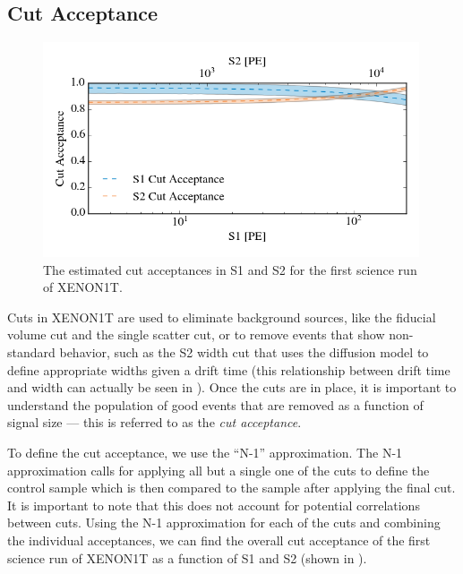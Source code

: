 

\subsection{Cut Acceptance}
\label{sec:xe1t_cut_acceptance}

\begin{figure}[t]
	\centering
	\includegraphics[width=0.99\textwidth]{xe1t_cut_acceptances}
	\caption{The estimated cut acceptances in S1 and S2 for the first science run of XENON1T.}
	\label{fig:xe1t_cut_acceptances}
\end{figure}


Cuts in XENON1T are used to eliminate background sources, like the fiducial volume cut and the single scatter cut, or to remove events that show non-standard behavior, such as the S2 width cut that uses the diffusion model to define appropriate widths given a drift time (this relationship between drift time and width can actually be seen in ).  Once the cuts are in place, it is important to understand the population of good events that are removed as a function of signal size --- this is referred to as the \textit{cut acceptance}.  

To define the cut acceptance, we use the ``N-1'' approximation.  The N-1 approximation calls for applying all but a single one of the cuts to define the control sample which is then compared to the sample after applying the final cut.  It is important to note that this does not account for potential correlations between cuts.  Using the N-1 approximation for each of the cuts and combining the individual acceptances, we can find the overall cut acceptance of the first science run of XENON1T as a function of S1 and S2 (shown in ).

